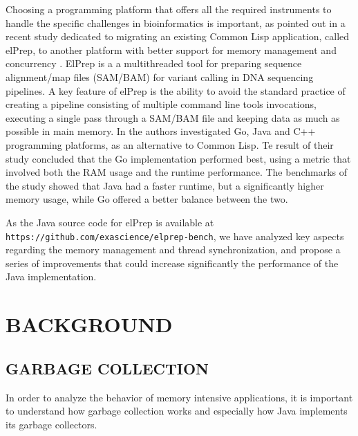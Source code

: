 \documentclass[a4paper,twoside]{article}
\begin{document}
Choosing a programming platform that offers all the required instruments to handle the specific challenges in bioinformatics is important, 
as pointed out in a recent study dedicated to migrating an existing Common Lisp application, called elPrep, 
to another platform with better support for memory management and concurrency \cite{costanza:2019}.
ElPrep \cite{herzeel:2019} is a a multithreaded tool for preparing sequence alignment/map files (SAM/BAM)
for variant calling in DNA sequencing pipelines. 
A key feature of elPrep is the ability to avoid the standard practice of creating a pipeline consisting of multiple command line tools invocations, 
executing a single pass through a SAM/BAM file and keeping data as much as possible in main memory.
In \cite{costanza:2019} the authors investigated Go, Java and C++ programming platforms, as an alternative to Common Lisp.
Te result of their study concluded that the Go implementation performed best, using a metric that involved both the RAM usage and the runtime performance.
The benchmarks of the study showed that Java had a faster runtime, but a significantly higher memory usage, while Go offered a better balance between the two.

As the Java source code for elPrep is available at {\tt https://github.com/exascience/elprep-bench}, we have analyzed key aspects regarding the memory management and
thread synchronization, and propose a series of improvements that could increase significantly the performance of the Java implementation. 


\section{\uppercase{Background}}

\subsection{\uppercase{Garbage Collection}}

In order to analyze the behavior of memory intensive applications,
it is important to understand how garbage collection works and especially how Java \cite{java} implements its garbage collectors.
\end{document}
